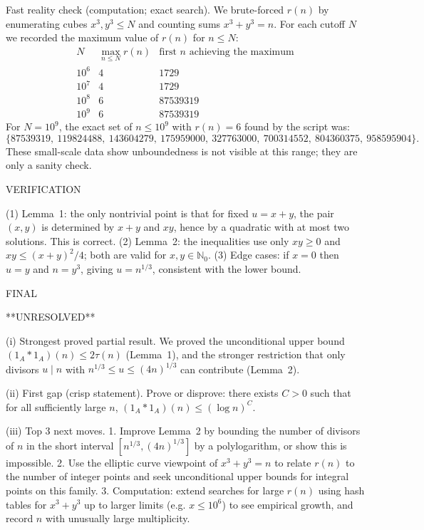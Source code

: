 Fast reality check (computation; exact search).
We brute-forced $r(n)$ by enumerating cubes $x^3,y^3\le N$ and counting sums $x^3+y^3=n$.
For each cutoff $N$ we recorded the maximum value of $r(n)$ for $n\le N$:
\[
\begin{array}{r|r|l}
N & \max_{n\le N} r(n) & \text{first $n$ achieving the maximum}\\\hline
10^6 & 4 & 1729\\
10^7 & 4 & 1729\\
10^8 & 6 & 87539319\\
10^9 & 6 & 87539319
\end{array}
\]
For $N=10^9$, the exact set of $n\le 10^9$ with $r(n)=6$ found by the script was:
\[
\{87539319,\ 119824488,\ 143604279,\ 175959000,\ 327763000,\ 700314552,\ 804360375,\ 958595904\}.
\]
These small-scale data show unboundedness is not visible at this range; they are only a sanity check.

VERIFICATION

(1) Lemma~1: the only nontrivial point is that for fixed $u=x+y$, the pair $(x,y)$ is determined by $x+y$ and $xy$, hence by a quadratic with at most two solutions. This is correct.
(2) Lemma~2: the inequalities use only $xy\ge 0$ and $xy\le (x+y)^2/4$; both are valid for $x,y\in\mathbb{N}_0$.
(3) Edge cases: if $x=0$ then $u=y$ and $n=y^3$, giving $u=n^{1/3}$, consistent with the lower bound.

FINAL

**UNRESOLVED**

(i) Strongest proved partial result.
We proved the unconditional upper bound $(1_A*1_A)(n)\le 2\tau(n)$ (Lemma~1), and the stronger restriction that only divisors $u\mid n$ with $n^{1/3}\le u\le (4n)^{1/3}$ can contribute (Lemma~2).

(ii) First gap (crisp statement).
Prove or disprove: there exists $C>0$ such that for all sufficiently large $n$, $(1_A*1_A)(n)\le (\log n)^C$.

(iii) Top 3 next moves.
1. Improve Lemma~2 by bounding the number of divisors of $n$ in the short interval $[n^{1/3},(4n)^{1/3}]$ by a polylogarithm, or show this is impossible.
2. Use the elliptic curve viewpoint of $x^3+y^3=n$ to relate $r(n)$ to the number of integer points and seek unconditional upper bounds for integral points on this family.
3. Computation: extend searches for large $r(n)$ using hash tables for $x^3+y^3$ up to larger limits (e.g. $x\le 10^6$) to see empirical growth, and record $n$ with unusually large multiplicity.

